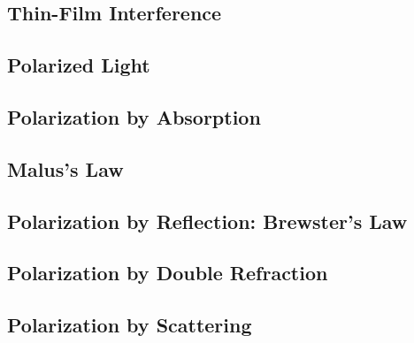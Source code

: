 \documentclass[twocolumn]{article}
\begin{document}
\subsection{Thin-Film Interference}
\begin{outline}
\1 
\end{outline}
\subsection{Polarized Light}
\begin{outline}
\1 
\end{outline}
\subsection{Polarization by Absorption}
\begin{outline}
\1 
\end{outline}
\subsection{Malus's Law}
\begin{outline}
\1 
\end{outline}
\subsection{Polarization by Reflection: Brewster's Law}
\begin{outline}
\1 
\end{outline}
\subsection{Polarization by Double Refraction}
\begin{outline}
\1 
\end{outline}
\subsection{Polarization by Scattering}
\begin{outline}
\1 
\end{outline}
\end{document}
